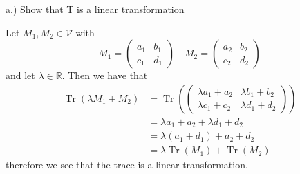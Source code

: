 \documentclass[a4paper, 11pt]{article}
\newcommand{\R}{\mathbb{R}}
\newenvironment{solution}{%
	\begin{list}{}{%
			\setlength{\topsep}{0pt}%
			\setlength{\leftmargin}{1.5cm}%
			\setlength{\rightmargin}{1.5cm}%
			\setlength{\listparindent}{\parindent}%
			\setlength{\itemindent}{\parindent}%
			\setlength{\parsep}{\parskip}%
		}%
		\item[]}{\end{list}}
\begin{document}
\noindent a.) Show that T is a linear transformation 
	\begin{solution}
		\noindent Let $M_1, M_2 \in \mathcal{V}$ with 
			\begin{equation*}
				M_1 = \begin{pmatrix}
					a_1 & b_1\\
					c_1 & d_1
				\end{pmatrix} \quad M_2 = \begin{pmatrix}
					a_2 & b_2 \\ 
					c_2 & d_2
				\end{pmatrix}
			\end{equation*}
		and let $\lambda \in \R$. Then we have that 
			\begin{align*}
				\operatorname{Tr}\left(\lambda M_1 + M_2\right) &= \operatorname{Tr}\left(\begin{pmatrix}
				 \lambda a_1 + a_2 & \lambda b_1 + b_2 \\ 
				 \lambda c_1 + c_2 & \lambda d_1 + d_2 
				\end{pmatrix}\right) \\
					&= \lambda a_1 + a_2 + \lambda d_1 + d_2 \\ 
					&= \lambda(a_1+d_1) + a_2+d_2 \\ 
					&= \lambda\operatorname{Tr}(M_1)+\operatorname{Tr}(M_2) 
			\end{align*}
		therefore we see that the trace is a linear transformation. \\
	\end{solution}
\end{document}
